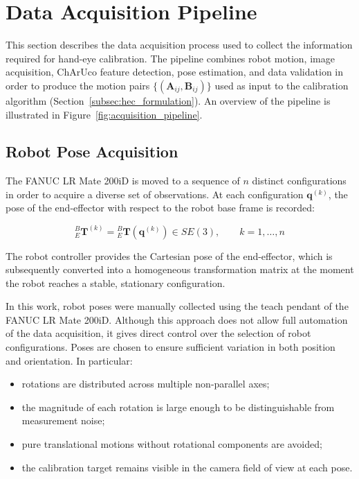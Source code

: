 




\section{Data Acquisition Pipeline}
\label{sec:acquisition_pipeline}

This section describes the data acquisition process used to collect the
information required for hand-eye calibration. The pipeline combines robot
motion, image acquisition, ChArUco feature detection, pose estimation, and
data validation in order to produce the motion pairs
$\{(\mathbf{A}_{ij}, \mathbf{B}_{ij})\}$ used as input to the calibration
algorithm (Section~\ref{subsec:hec_formulation}). An overview of the pipeline
is illustrated in Figure~\ref{fig:acquisition_pipeline}.

\subsection{Robot Pose Acquisition}
\label{subsec:robot_pose_acq}

The FANUC LR Mate 200iD is moved to a sequence of $n$ distinct configurations
in order to acquire a diverse set of observations. At each configuration
$\mathbf{q}^{(k)}$, the pose of the end-effector with respect to the robot
base frame is recorded:

\begin{equation}
	{}^B_E\mathbf{T}^{(k)} = {}^B_E\mathbf{T}\!\left(\mathbf{q}^{(k)}\right)
	\in SE(3), \qquad k = 1, \dots, n
	\label{eq:recorded_poses}
\end{equation}

\noindent The robot controller provides the Cartesian pose of the end-effector, which is subsequently converted into a homogeneous transformation matrix at the moment the robot reaches a stable,
stationary configuration.

In this work, robot poses were manually collected using the teach pendant of
the FANUC LR Mate 200iD. Although this approach does not allow full automation
of the data acquisition, it gives direct control over the selection of robot
configurations. Poses are chosen to ensure sufficient variation in both
position and orientation. In particular:

\begin{itemize}
	\item rotations are distributed across multiple non-parallel axes;
	\item the magnitude of each rotation is large enough to be distinguishable
	from measurement noise;
	\item pure translational motions without rotational components are avoided;
	\item the calibration target remains visible in the camera field of view
	at each pose.
\end{itemize}

